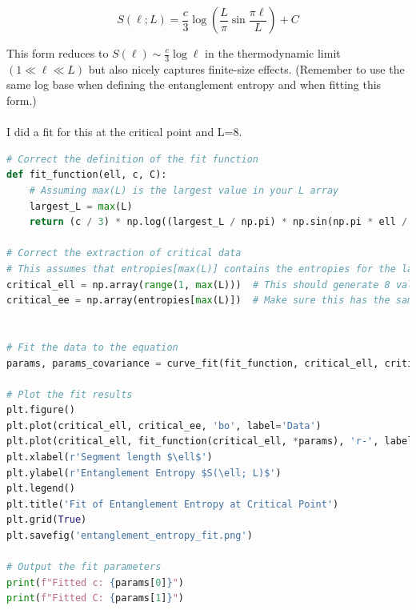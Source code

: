 \documentclass[12pt]{article}
\begin{document}
\begin{equation*}
S(\ell ; L)=\frac{c}{3} \log \left(\frac{L}{\pi} \sin \frac{\pi \ell}{L}\right)+C \tag{26}
\end{equation*}


This form reduces to $S(\ell) \sim \frac{c}{3} \log \ell$ in the thermodynamic limit $(1 \ll \ell \ll L)$ but also nicely captures finite-size effects. (Remember to use the same log base when defining the entanglement entropy and when fitting this form.)\\\\
I did a fit for this at the critical point and L=8.
\begin{lstlisting}[language=Python]
# Correct the definition of the fit function
def fit_function(ell, c, C):
    # Assuming max(L) is the largest value in your L array
    largest_L = max(L)  
    return (c / 3) * np.log((largest_L / np.pi) * np.sin(np.pi * ell / largest_L)) + C

# Correct the extraction of critical data
# This assumes that entropies[max(L)] contains the entropies for the largest system size at the critical point h=1
critical_ell = np.array(range(1, max(L)))  # This should generate 8 values if max(L) is 8
critical_ee = np.array(entropies[max(L)])  # Make sure this has the same number of values as critical_ell


# Fit the data to the equation
params, params_covariance = curve_fit(fit_function, critical_ell, critical_ee)

# Plot the fit results
plt.figure()
plt.plot(critical_ell, critical_ee, 'bo', label='Data')
plt.plot(critical_ell, fit_function(critical_ell, *params), 'r-', label=f'Fit: ${params[0]:.2f}/3 \log((L/\pi) \sin(\pi \ell / L)) + {params[1]:.2f}$')
plt.xlabel(r'Segment length $\ell$')
plt.ylabel(r'Entanglement Entropy $S(\ell; L)$')
plt.legend()
plt.title('Fit of Entanglement Entropy at Critical Point')
plt.grid(True)
plt.savefig('entanglement_entropy_fit.png')

# Output the fit parameters
print(f"Fitted c: {params[0]}")
print(f"Fitted C: {params[1]}")


\end{lstlisting}
\end{document}
